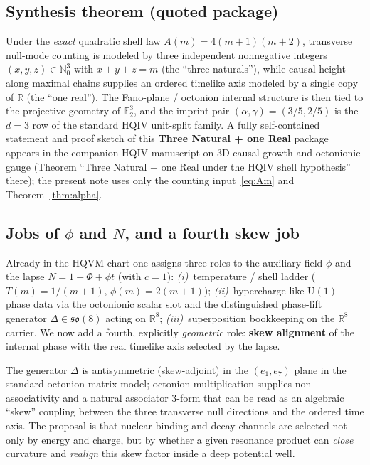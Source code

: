 \documentclass[11pt,a4paper]{article}
\theoremstyle{plain}
\theoremstyle{definition}
\theoremstyle{remark}
\theoremstyle{plain}
\theoremstyle{definition}
\begin{document}
\subsection{Synthesis theorem (quoted package)}

Under the \emph{exact} quadratic shell law $A(m)=4(m+1)(m+2)$, transverse null-mode counting is modeled by three independent nonnegative integers $(x,y,z)\in\mathbb{N}_0^3$ with $x+y+z=m$ (the ``three naturals''), while causal height along maximal chains supplies an ordered timelike axis modeled by a single copy of $\mathbb{R}$ (the ``one real'').
The Fano-plane / octonion internal structure is then tied to the projective geometry of $\mathbb{F}_2^3$, and the imprint pair $(\alpha,\gamma)=(3/5,2/5)$ is the $d=3$ row of the standard HQIV unit-split family.
A fully self-contained statement and proof sketch of this \textbf{Three Natural + one Real} package appears in the companion HQIV manuscript on $3$D causal growth and octonionic gauge (Theorem ``Three Natural + one Real under the HQIV shell hypothesis'' there); the present note uses only the counting input~\eqref{eq:Am} and Theorem~\ref{thm:alpha}.

\subsection{Jobs of $\phi$ and $N$, and a fourth skew job}

Already in the HQVM chart one assigns three roles to the auxiliary field $\phi$ and the lapse $N=1+\Phi+\phi t$ (with $c=1$): \emph{(i)}~temperature / shell ladder ($T(m)=1/(m+1)$, $\phi(m)=2(m+1)$); \emph{(ii)}~hypercharge-like $\mathrm{U}(1)$ phase data via the octonionic scalar slot and the distinguished phase-lift generator $\Delta\in\mathfrak{so}(8)$ acting on $\mathbb{R}^8$; \emph{(iii)}~superposition bookkeeping on the $\mathbb{R}^8$ carrier.
We now add a fourth, explicitly \emph{geometric} role: \textbf{skew alignment} of the internal phase with the real timelike axis selected by the lapse.

The generator $\Delta$ is antisymmetric (skew-adjoint) in the $(e_1,e_7)$ plane in the standard octonion matrix model; octonion multiplication supplies non-associativity and a natural associator $3$-form that can be read as an algebraic ``skew'' coupling between the three transverse null directions and the ordered time axis.
The proposal is that nuclear binding and decay channels are selected not only by energy and charge, but by whether a given resonance product can \emph{close} curvature and \emph{realign} this skew factor inside a deep potential well.
\end{document}
